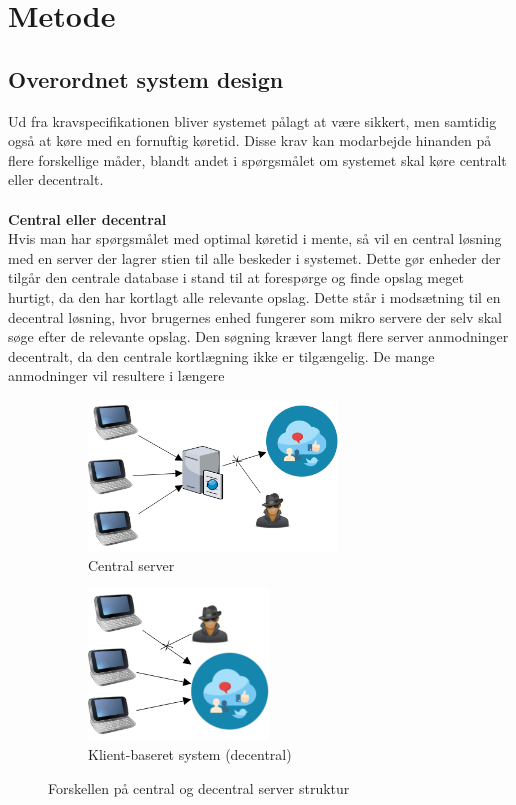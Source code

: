 \section{Metode}
\subsection{Overordnet system design}
Ud fra kravspecifikationen bliver systemet pålagt at være sikkert, men samtidig også at køre med en fornuftig køretid. Disse krav kan  modarbejde hinanden på flere forskellige måder, blandt andet i spørgsmålet om systemet skal køre centralt eller decentralt.
\\\\
\textbf{Central eller decentral}\\
Hvis man har spørgsmålet med optimal køretid i mente, så vil en central løsning med en server der lagrer stien til alle beskeder i systemet. Dette gør enheder der tilgår den centrale database i stand til at forespørge og finde opslag meget hurtigt, da den har kortlagt alle relevante opslag. Dette står i modsætning til en decentral løsning, hvor brugernes enhed fungerer som mikro servere der selv skal søge efter de relevante opslag. Den søgning kræver langt flere server anmodninger decentralt, da den centrale kortlægning ikke er tilgængelig. De mange anmodninger vil resultere i længere 

\begin{figure}[H]
    \begin{subfigure}{0.5\textwidth}
        \centering
        \includegraphics[width=1\linewidth, height=4cm]{Projectdoc/Assets/Illustrationer/Security_diagram_1.png} 
        \caption{Central server}
        \label{fig:central_server}
    \end{subfigure}
    \begin{subfigure}{0.5\textwidth}
        \centering
        \includegraphics[width=0.7\linewidth, height=4cm]{Projectdoc/Assets/Illustrationer/Security_diagram_2.png}
        \caption{Klient-baseret system (decentral)}
        \label{fig:decentral_server}
    \end{subfigure}
    \caption{Forskellen på central og decentral server struktur}
    \label{fig:serverstruktur}
\end{figure}

